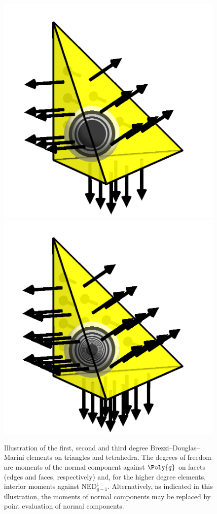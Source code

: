 \begin{figure}
\begin{center}
    \includegraphics[width=\elmfigsizetriple]{chapters/kirby-6/png/BDM2_3d.png}
    \includegraphics[width=\elmfigsizetriple]{chapters/kirby-6/png/BDM3_3d.png}
    \caption{Illustration of the first, second and third degree
      Brezzi--Douglas--Marini elements on triangles and tetrahedra.
      The degrees of freedom are moments of the normal component
      against $\Poly{q}$ on facets (edges and faces, respectively)
      and, for the higher degree elements, interior moments against
      $\mathrm{NED}^1_{q-1}$. Alternatively, as indicated in this
      illustration, the moments of normal components may be replaced
      by point evaluation of normal components.}
  \end{center}
  \label{kirby-6:fig:bdm}
\end{figure}

